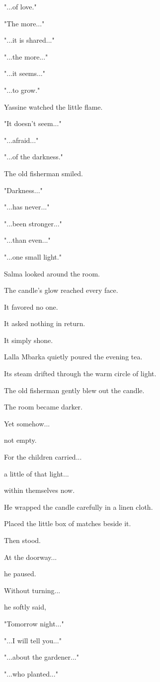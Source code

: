 \documentclass[12pt,openany]{book}
\begin{document}
"...of love."

"The more..."

"...it is shared..."

"...the more..."

"...it seems..."

"...to grow."

Yassine watched the little flame.

"It doesn't seem..."

"...afraid..."

"...of the darkness."

The old fisherman smiled.

"Darkness..."

"...has never..."

"...been stronger..."

"...than even..."

"...one small light."

Salma looked around the room.

The candle's glow reached every face.

It favored no one.

It asked nothing in return.

It simply shone.

Lalla Mbarka quietly poured the evening tea.

Its steam drifted through the warm circle of light.

The old fisherman gently blew out the candle.

The room became darker.

Yet somehow...

not empty.

For the children carried...

a little of that light...

within themselves now.

He wrapped the candle carefully in a linen cloth.

Placed the little box of matches beside it.

Then stood.

At the doorway...

he paused.

Without turning...

he softly said,

"Tomorrow night..."

"...I will tell you..."

"...about the gardener..."

"...who planted..."
\end{document}

